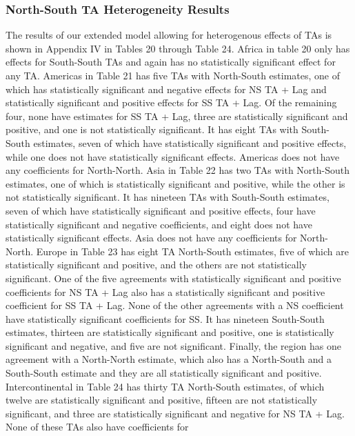 \documentclass[12pt]{article}%
\begin{document}
\subsubsection{North{-}South TA Heterogeneity Results}%
\label{ssubsec:North{-}SouthTAHeterogeneityResults}%
The results of our extended model allowing for heterogenous effects of
TAs is shown in Appendix IV in Tables 20 through Table 24. Africa in
table 20 only has effects for South-South TAs and again has no
statistically significant effect for any TA. Americas in Table 21 has
five TAs with North-South estimates, one of which has statistically
significant and negative effects for NS TA + Lag and statistically
significant and positive effects for SS TA + Lag. Of the remaining four,
none have estimates for SS TA + Lag, three are statistically significant
and positive, and one is not statistically significant. It has eight TAs
with South-South estimates, seven of which have statistically
significant and positive effects, while one does not have statistically
significant effects. Americas does not have any coefficients for
North-North. Asia in Table 22 has two TAs with North-South estimates,
one of which is statistically significant and positive, while the other
is not statistically significant. It has nineteen TAs with South-South
estimates, seven of which have statistically significant and positive
effects, four have statistically significant and negative coefficients,
and eight does not have statistically significant effects. Asia does not
have any coefficients for North-North. Europe in Table 23 has eight TA
North-South estimates, five of which are statistically significant and
positive, and the others are not statistically significant. One of the
five agreements with statistically significant and positive coefficients
for NS TA + Lag also has a statistically significant and positive
coefficient for SS TA + Lag. None of the other agreements with a NS
coefficient have statistically significant coefficients for SS. It has
nineteen South-South estimates, thirteen are statistically significant
and positive, one is statistically significant and negative, and five
are not significant. Finally, the region has one agreement with a
North-North estimate, which also has a North-South and a South-South
estimate and they are all statistically significant and positive.
Intercontinental in Table 24 has thirty TA North-South estimates, of
which twelve are statistically significant and positive, fifteen are not
statistically significant, and three are statistically significant and
negative for NS TA + Lag. None of these TAs also have coefficients for
\end{document}
